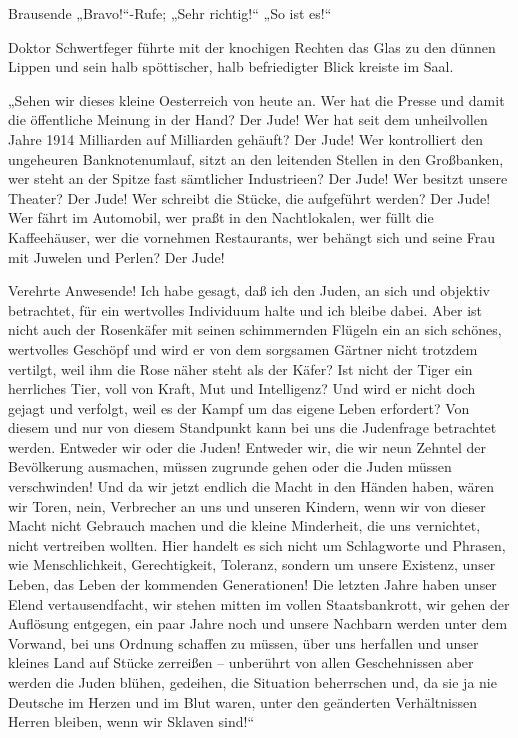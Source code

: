 Brausende „Bravo!“-Rufe; „Sehr richtig!“ „So ist
es!“

Doktor Schwertfeger führte mit der knochigen Rechten das Glas zu
den dünnen Lippen und sein halb spöttischer, halb befriedigter
Blick kreiste im Saal.

„Sehen wir dieses kleine Oesterreich von heute an. Wer hat die
Presse und damit die öffentliche Meinung in der Hand? Der Jude! Wer
hat seit dem unheilvollen Jahre 1914 Milliarden auf Milliarden
gehäuft? Der Jude! Wer kontrolliert den ungeheuren Banknotenumlauf,
sitzt an den leitenden Stellen in den Großbanken, wer steht an der
Spitze fast sämtlicher Industrieen? Der Jude! Wer besitzt unsere
Theater? Der Jude! Wer schreibt die Stücke, die aufgeführt werden?
Der Jude! Wer fährt im Automobil, wer praßt in den Nachtlokalen,
wer füllt die Kaffeehäuser, wer die vornehmen Restaurants, wer
behängt sich und seine Frau mit Juwelen und Perlen? Der Jude!

Verehrte Anwesende! Ich habe gesagt, daß ich den Juden, an sich und
objektiv betrachtet, für ein wertvolles Individuum halte und ich
bleibe dabei. Aber ist nicht auch der Rosenkäfer mit seinen
schimmernden Flügeln ein an sich schönes, wertvolles Geschöpf und
wird er von dem sorgsamen Gärtner nicht trotzdem vertilgt, weil ihm
die Rose näher steht als der Käfer? Ist nicht der Tiger ein
herrliches Tier, voll von Kraft, Mut und Intelligenz? Und wird er
nicht doch gejagt und verfolgt, weil es der Kampf um das eigene
Leben erfordert? Von diesem und nur von diesem Standpunkt kann bei
uns die Judenfrage  betrachtet werden. Entweder wir
oder die Juden! Entweder wir, die wir neun Zehntel der Bevölkerung
ausmachen, müssen zugrunde gehen oder die Juden müssen
verschwinden! Und da wir jetzt endlich die Macht in den Händen
haben, wären wir Toren, nein, Verbrecher an uns und unseren
Kindern, wenn wir von dieser Macht nicht Gebrauch machen und die
kleine Minderheit, die uns vernichtet, nicht vertreiben wollten.
Hier handelt es sich nicht um Schlagworte und Phrasen, wie
Menschlichkeit, Gerechtigkeit, Toleranz, sondern um unsere
Existenz, unser Leben, das Leben der kommenden Generationen! Die
letzten Jahre haben unser Elend vertausendfacht, wir stehen mitten
im vollen Staatsbankrott, wir gehen der Auflösung entgegen, ein
paar Jahre noch und unsere Nachbarn werden unter dem Vorwand, bei
uns Ordnung schaffen zu müssen, über uns herfallen und unser
kleines Land auf Stücke zerreißen – unberührt von allen
Geschehnissen aber werden die Juden blühen, gedeihen, die Situation
beherrschen und, da sie ja nie Deutsche im Herzen und im Blut
waren, unter den geänderten Verhältnissen Herren bleiben, wenn wir
Sklaven sind!“

